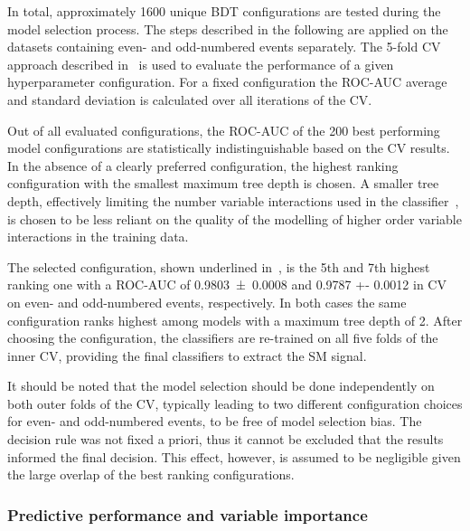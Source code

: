 In total, approximately 1600 unique BDT configurations are tested
during the model selection process. The steps described in the
following are applied on the datasets containing even- and
odd-numbered events separately. The 5-fold CV approach described
in~ is used to evaluate the performance
of a given hyperparameter configuration. For a fixed configuration the
ROC-AUC average and standard deviation is calculated over all
iterations of the CV.

Out of all evaluated configurations, the ROC-AUC of the 200 best
performing model configurations are statistically indistinguishable
based on the CV results. In the absence of a clearly preferred
configuration, the highest ranking configuration with the smallest
maximum tree depth is chosen. A smaller tree depth, effectively
limiting the number variable interactions used in the
classifier~\cite{hastie09}, is chosen to be less reliant on the
quality of the modelling of higher order variable interactions in the
training data.

The selected configuration, shown underlined
in~, is the 5th and 7th highest
ranking one with a ROC-AUC of \num{0.9803 +- 0.0008} and \num{0.9787
  +- 0.0012} in CV on even- and odd-numbered events, respectively. In
both cases the same configuration ranks highest among models with a
maximum tree depth of 2.  After choosing the configuration, the
classifiers are re-trained on all five folds of the inner CV,
providing the final classifiers to extract the SM \HH signal.

It should be noted that the model selection should be done
independently on both outer folds of the CV, typically leading to two
different configuration choices for even- and odd-numbered events, to
be free of model selection bias. The decision rule was not fixed a
priori, thus it cannot be excluded that the results informed the final
decision. This effect, however, is assumed to be negligible given the
large overlap of the best ranking configurations.



\subsubsection{Predictive performance and variable importance}

